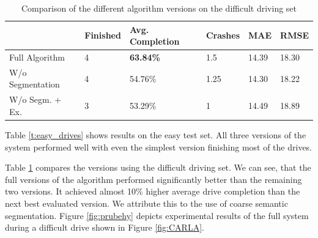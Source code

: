 \documentclass{ctuthesis/ctuthesis}
\begin{document}
\begin{table}[]
\tabcolsep=0.11cm
\begin{tabular}{l|lllll}
\hline
                                      & Finished & Avg. Completion & Crashes & MAE   & RMSE   \\ \hline
Full Algorithm                         & 4               & \textbf{63.84\%}         & 1.5     & 14.39 & 18.30    \\
W/o Segmentation                   & 4               & 54.76\%                  & 1.25    & 14.30 & 18.22 \\
W/o Segm. + Ex. & 3               & 53.29\%                  & 1       & 14.49 & 18.89    \\ \hline
\end{tabular}
\caption{Comparison of the different algorithm versions on the difficult driving set}\label{t:difficult_drives}
\end{table}

Table \ref{t:easy_drives} shows results on the easy test set. All three versions of the system performed well with even the simplest version finishing most of the drives. \par
Table \ref{t:difficult_drives} compares the versions using the difficult driving set. We can see, that the full versions of the algorithm performed significantly better than the remaining two versions. It achieved almost 10\% higher average drive completion than the next best evaluated version. We attribute this to the use of coarse semantic segmentation. Figure \ref{fig:prubehy} depicts experimental results of the full system during a difficult drive shown in Figure \ref{fig:CARLA}.\par
\end{document}
